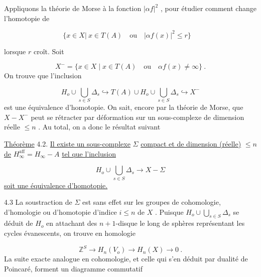 Appliquons la théorie de Morse à la fonction $|\alpha f|^2$ , pour étudier comment change l'homotopie de

\begin{equation*}
\{x \in X| \ x \in T(A) \quad \mathrm{ou} \quad |\alpha f(x)|^2 \leq r \} \quad 
\end{equation*}


 lorsque $r$ croît. Soit

\begin{equation*}
X^- = \{x \in X \mid x \in T(A) \quad \mathrm{ou} \quad \alpha f(x) \neq \infty \} \ .
\end{equation*}
On trouve que l'inclusion

\begin{equation*}
H_o \cup \bigcup_{s \in S} \Delta_s \hookrightarrow T(A) \cup H_o \cup \bigcup_{s \in S} \Delta_s \hookrightarrow X^-
\end{equation*}
est une équivalence d'homotopie. On sait, encore par la théorie de Morse, que $X - X^-$ peut se rétracter par déformation sur un sous-complexe de dimension réelle $\leq n$ . Au total, on a donc le résultat suivant

\underline{Théorème} 4.2. \quad \underline{Il existe un sous-complexe} $\Sigma$ \underline{compact et de dimension (réelle)} $\leq n$ \underline{de} $H_\infty^{\mathrm{aff}} = H_\infty - A$ \underline{tel que l'inclusion}

\begin{equation*}
H_o \cup \bigcup_{s \in S} \Delta_s \longrightarrow X - \Sigma
\end{equation*}
\underline{soit une équivalence d'homotopie.}

4.3 \quad La soustraction de $\Sigma$ est sans effet sur les groupes de cohomologie, d'homologie ou d'homotopie d'indice $i \leq n$ de $X$ . Puisque $H_o \cup \bigcup_{s \in S} \Delta_s$ se déduit de $H_o$ en attachant des $n+1$-disque le long de sphères représentant les cycles évanescents, on trouve en homologie

\begin{equation*}
\mathbb{Z}^S \longrightarrow H_n(V_o) \longrightarrow H_n(X) \longrightarrow 0 \ .
\end{equation*}
La suite exacte analogue en cohomologie, et celle qui s'en déduit par dualité de Poincaré, forment un diagramme commutatif

